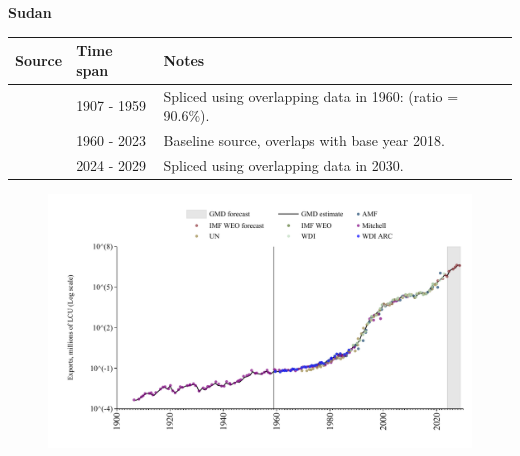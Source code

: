 \documentclass[12pt,a4paper,landscape]{article}
\begin{document}
\begin{adjustbox}{max totalsize={\paperwidth}{\paperheight},center}
\begin{minipage}[t][\textheight][t]{\textwidth}
\vspace*{0.5cm}
{}
\begin{center}
{\Large\bfseries Sudan}
\end{center}
\vspace{0.5cm}
\begin{table}[H]
\centering
\small
\begin{tabular}{|l|l|l|}
\hline
\textbf{Source} & \textbf{Time span} & \textbf{Notes} \\
\hline
\rowcolor{white}\cite{Mitchell}& 1907 - 1959 &Spliced using overlapping data in 1960: (ratio = 90.6\%).\\
\rowcolor{lightgray}\cite{WDI}& 1960 - 2023 &Baseline source, overlaps with base year 2018.\\
\rowcolor{white}\cite{IMF_WEO_forecast}& 2024 - 2029 &Spliced using overlapping data in 2030.\\
\hline
\end{tabular}
\end{table}
\begin{figure}[H]
\centering
\includegraphics[width=\textwidth,height=0.6\textheight,keepaspectratio]{graphs/SDN_exports.pdf}
\end{figure}
\end{minipage}
\end{adjustbox}
\end{document}
